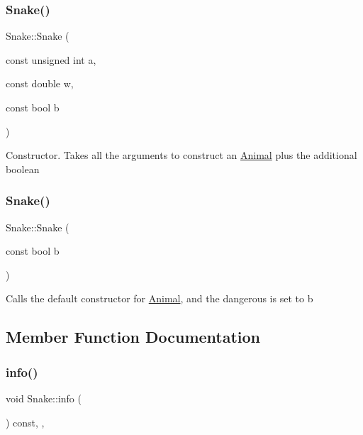 \subsubsection{\texorpdfstring{Snake()}{Snake()}\hspace{0.1cm}{\footnotesize\ttfamily [1/2]}}
{\footnotesize\ttfamily Snake\+::\+Snake (\begin{DoxyParamCaption}\item[{const unsigned int}]{a,  }\item[{const double}]{w,  }\item[{const bool}]{b }\end{DoxyParamCaption})}

Constructor. Takes all the arguments to construct an \hyperlink{classAnimal}{Animal} plus the additional boolean \mbox{\label{classSnake_a3155ff2573c745c17c8b8ca8b90b5926}} 
\subsubsection{\texorpdfstring{Snake()}{Snake()}\hspace{0.1cm}{\footnotesize\ttfamily [2/2]}}
{\footnotesize\ttfamily Snake\+::\+Snake (\begin{DoxyParamCaption}\item[{const bool}]{b }\end{DoxyParamCaption})}

Calls the default constructor for \hyperlink{classAnimal}{Animal}, and the {\ttfamily dangerous} is set to {\ttfamily b} 

\subsection{Member Function Documentation}
\mbox{\label{classSnake_a502e4a95caef8a4220527a31cc67d8dc}} 
\subsubsection{\texorpdfstring{info()}{info()}}
{\footnotesize\ttfamily void Snake\+::info (\begin{DoxyParamCaption}{ }\end{DoxyParamCaption}) const\hspace{0.3cm}{\ttfamily [override]}, {\ttfamily [virtual]}, {\ttfamily [noexcept]}}

